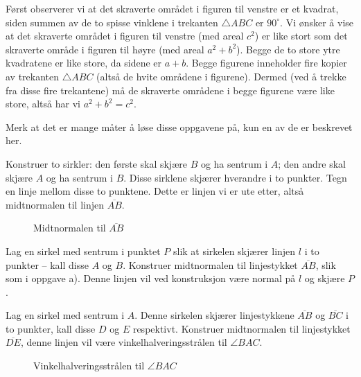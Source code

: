 
 
\begin{oppgave}[1.6.3]
  Først observerer vi at det skraverte området i figuren til venstre er et kvadrat,
  siden summen av de to spisse vinklene i trekanten $\triangle ABC$ er $90^\circ$. 
  Vi ønsker å vise at det skraverte området i figuren til venstre (med areal $c^2$) 
  er like stort som det skraverte område i figuren til høyre (med areal $a^2+b^2$). 
  Begge de to store ytre kvadratene er like store, da sidene er $a+b$. Begge figurene
  inneholder fire kopier av trekanten $\triangle ABC$ (altså de hvite områdene i
  figurene). Dermed (ved å trekke fra disse fire trekantene) må de skraverte områdene
  i begge figurene være like store, altså har vi $a^2+b^2 = c^2$. 
\end{oppgave}
 
\begin{oppgave}[1.6.6]
  Merk at det er mange måter å løse disse oppgavene på, kun en av de er beskrevet her. 
  \begin{punkt}
    Konstruer to sirkler: den første skal skjære $B$ og ha sentrum i $A$; den andre 
    skal skjære $A$ og ha sentrum i $B$. Disse sirklene skjærer hverandre i to punkter. 
    Tegn en linje mellom disse to punktene. Dette er linjen vi er ute etter, altså 
    midtnormalen til linjen $\overline{AB}$. 
    \begin{figure}[H]
      \centering
      
      \caption{Midtnormalen til $\overline{AB}$}
    \end{figure}
  \end{punkt}

  \begin{punkt}
    Lag en sirkel med sentrum i punktet $P$ slik at sirkelen skjærer linjen $l$ i to 
    punkter -- kall disse $A$ og $B$. Konstruer midtnormalen til linjestykket 
    $\overline{AB}$, slik som i oppgave a). Denne linjen vil ved konstruksjon være 
    normal på $l$ og skjære $P$. 
    \begin{figure}[H]
      \centering
      
    \end{figure}
  \end{punkt}

  \begin{punkt}
    Lag en sirkel med sentrum i $A$. Denne sirkelen skjærer linjestykkene $\overline{AB}$ 
    og $\overline{BC}$ i to punkter, kall disse $D$ og $E$ respektivt. Konstruer 
    midtnormalen til linjestykket $\overline{DE}$, denne linjen vil være 
    vinkelhalveringsstrålen til $\angle BAC$.
    
    \begin{figure}[H]
      \centering
      
      \caption{Vinkelhalveringsstrålen til $\angle BAC$}
    \end{figure}
  \end{punkt}
\end{oppgave}

